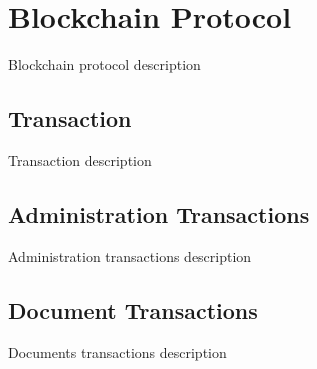 \newpage
\section{Blockchain Protocol}
Blockchain protocol description

\subsection{Transaction}
Transaction description

\subsection{Administration Transactions}
Administration transactions description

\subsection{Document Transactions}
Documents transactions description
